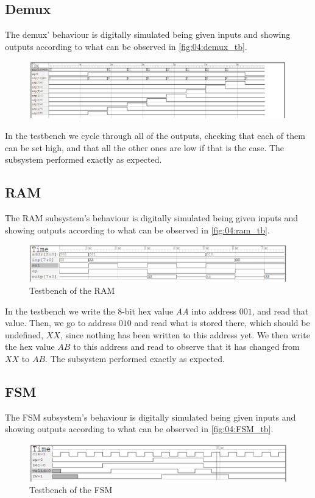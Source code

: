 \subsection{Demux}
The demux' behaviour is digitally simulated being given inputs and showing outputs according to what can be observed in \autoref{fig:04:demux_tb}.

\begin{figure}[H]
    \centering
    \includegraphics[width=0.99\linewidth]{LaTeX_2/Figures/demux1to8_tb.png}
    \caption{}
    \label{fig:04:demux_tb}
\end{figure}
In the testbench we cycle through all of the outputs, checking that each of them can be set high, and that all the other ones are low if that is the case. The subsystem performed exactly as expected.

\subsection{RAM}
The RAM subsystem's behaviour is digitally simulated being given inputs and showing outputs according to what can be observed in \autoref{fig:04:ram_tb}.
\begin{figure}[H]
    \centering
    \includegraphics[width=0.9\linewidth]{LaTeX_2/Figures/ram_tb.png}
    \caption{Testbench of the RAM}
    \label{fig:04:ram_tb}
\end{figure}
In the testbench we write the 8-bit hex value \textit{AA} into address $001$, and read that value. Then, we go to address $010$ and read what is stored there, which should be undefined, $XX$, since nothing has been written to this address yet. We then write the hex value $AB$ to this address and read to observe that it has changed from $XX$ to $AB$. The subsystem performed exactly as expected.

\subsection{FSM}
The FSM subsystem's behaviour is digitally simulated being given inputs and showing outputs according to what can be observed in \autoref{fig:04:FSM_tb}.
\begin{figure}[H]
    \centering
    \includegraphics[width=0.9\linewidth]{LaTeX_2/Figures/FSM_tb.png}
    \caption{Testbench of the FSM}
    \label{fig:04:FSM_tb}
\end{figure}


